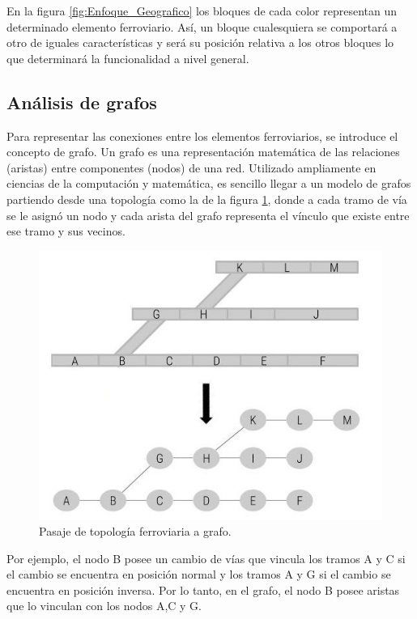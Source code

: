 	En la figura \ref{fig:Enfoque_Geografico} los bloques de cada color representan un determinado elemento ferroviario. Así, un bloque cualesquiera se comportará a otro de iguales características y será su posición relativa a los otros bloques lo que determinará la funcionalidad a nivel general.
	
	\subsection{Análisis de grafos}
	\label{grafos}
		Para representar las conexiones entre los elementos ferroviarios, se introduce el concepto de grafo. Un grafo es una representación matemática de las relaciones (aristas) entre componentes (nodos) de una red. Utilizado ampliamente en ciencias de la computación y matemática, es sencillo llegar a un modelo de grafos partiendo desde una topología como la de la figura \ref{fig:Topologia_Grafo}, donde a cada tramo de vía se le asignó un nodo y cada arista del grafo representa el vínculo que existe entre ese tramo y sus vecinos.
		
		\begin{figure}[h]
		\centering
			\includegraphics[scale=.4]{./Figures/Topologia_grafo}
			\caption{Pasaje de topología ferroviaria a grafo.}
			\label{fig:Topologia_Grafo}
		\end{figure}
	
		Por ejemplo, el nodo B posee un cambio de vías que vincula los tramos A y C si el cambio se encuentra en posición normal y los tramos A y G si el cambio se encuentra en posición inversa. Por lo tanto, en el grafo, el nodo B posee aristas que lo vinculan con los nodos A,C y G.
		
